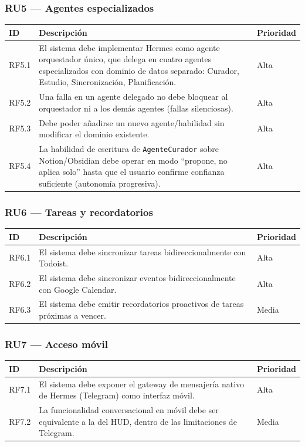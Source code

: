 \documentclass[11pt,a4paper]{article}
\begin{document}
\subsubsection*{RU5 --- Agentes especializados}
\begin{longtable}{@{}p{1.5cm}p{11.2cm}p{1.7cm}@{}}
\toprule
ID & Descripción & Prioridad \\
\midrule
\endhead
RF5.1 & El sistema debe implementar Hermes como agente orquestador único, que delega en cuatro agentes especializados con dominio de datos separado: Curador, Estudio, Sincronización, Planificación. & Alta \\
RF5.2 & Una falla en un agente delegado no debe bloquear al orquestador ni a los demás agentes (fallas silenciosas). & Alta \\
RF5.3 & Debe poder añadirse un nuevo agente/habilidad sin modificar el dominio existente. & Alta \\
RF5.4 & La habilidad de escritura de \texttt{AgenteCurador} sobre Notion/Obsidian debe operar en modo ``propone, no aplica solo'' hasta que el usuario confirme confianza suficiente (autonomía progresiva). & Alta \\
\bottomrule
\end{longtable}

\subsubsection*{RU6 --- Tareas y recordatorios}
\begin{longtable}{@{}p{1.5cm}p{11.2cm}p{1.7cm}@{}}
\toprule
ID & Descripción & Prioridad \\
\midrule
\endhead
RF6.1 & El sistema debe sincronizar tareas bidireccionalmente con Todoist. & Alta \\
RF6.2 & El sistema debe sincronizar eventos bidireccionalmente con Google Calendar. & Alta \\
RF6.3 & El sistema debe emitir recordatorios proactivos de tareas próximas a vencer. & Media \\
\bottomrule
\end{longtable}

\subsubsection*{RU7 --- Acceso móvil}
\begin{longtable}{@{}p{1.5cm}p{11.2cm}p{1.7cm}@{}}
\toprule
ID & Descripción & Prioridad \\
\midrule
\endhead
RF7.1 & El sistema debe exponer el gateway de mensajería nativo de Hermes (Telegram) como interfaz móvil. & Alta \\
RF7.2 & La funcionalidad conversacional en móvil debe ser equivalente a la del HUD, dentro de las limitaciones de Telegram. & Media \\
\bottomrule
\end{longtable}
\end{document}
